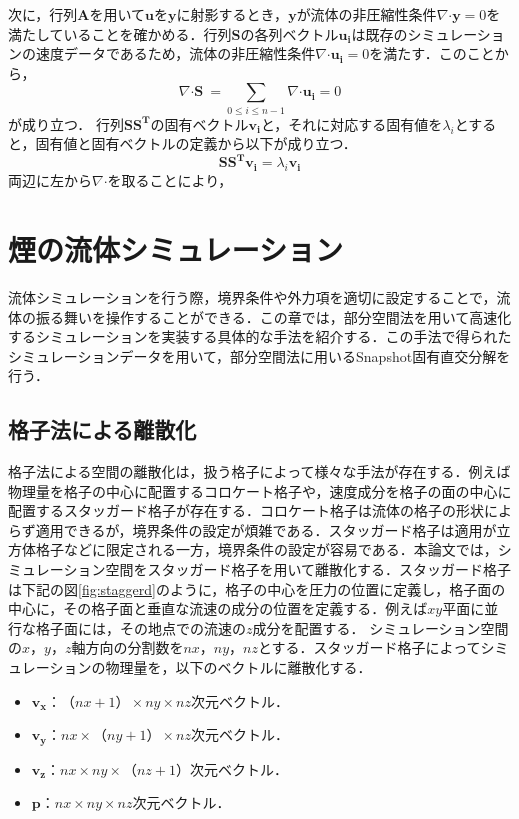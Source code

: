 \documentclass[a4j,12pt]{jreport}
\begin{document}
次に，行列$\mathbf{A}$を用いて$\bm{u}$を$\bm{y}$に射影するとき，$\bm{y}$が流体の非圧縮性条件$\nabla\boldsymbol{\cdot}\bm{y} = 0$を満たしていることを確かめる．行列$\mathbf{S}$の各列ベクトル$\bm{u_i}$は既存のシミュレーションの速度データであるため，流体の非圧縮性条件$\nabla\boldsymbol{\cdot}\bm{u_i} = 0$を満たす．このことから，
\[
	\nabla\boldsymbol{\cdot}\mathbf{S}\ = \sum_{0 \le i \le n-1}\nabla\boldsymbol{\cdot}\bm{u_i} = 0
\]
が成り立つ．
行列$\mathbf{S}\mathbf{S^T}$の固有ベクトル$\bm{v_i}$と，それに対応する固有値を$\lambda_i$とすると，固有値と固有ベクトルの定義から以下が成り立つ．
\[
	\mathbf{S}\mathbf{S^T}\bm{v_i} = \lambda_i\bm{v_i}
\]
両辺に左から$\nabla\boldsymbol{\cdot}$を取ることにより，
\chapter{煙の流体シミュレーション}
流体シミュレーションを行う際，境界条件や外力項を適切に設定することで，流体の振る舞いを操作することができる．この章では，部分空間法を用いて高速化するシミュレーションを実装する具体的な手法を紹介する．この手法で得られたシミュレーションデータを用いて，部分空間法に用いるSnapshot固有直交分解を行う．

\section{格子法による離散化}
格子法による空間の離散化は，扱う格子によって様々な手法が存在する．例えば物理量を格子の中心に配置するコロケート格子や，速度成分を格子の面の中心に配置するスタッガード格子が存在する．コロケート格子は流体の格子の形状によらず適用できるが，境界条件の設定が煩雑である．スタッガード格子は適用が立方体格子などに限定される一方，境界条件の設定が容易である．本論文では，シミュレーション空間をスタッガード格子を用いて離散化する．スタッガード格子は下記の図\ref{fig:staggerd}のように，格子の中心を圧力の位置に定義し，格子面の中心に，その格子面と垂直な流速の成分の位置を定義する．例えば$xy$平面に並行な格子面には，その地点での流速の$z$成分を配置する．
シミュレーション空間の$x$，$y$，$z$軸方向の分割数を$nx$，$ny$，$nz$とする．スタッガード格子によってシミュレーションの物理量を，以下のベクトルに離散化する．
\begin{itemize}
	\item	$\bm{v_x}$：$（nx+1） \times ny \times nz$次元ベクトル．
	\item	$\bm{v_y}$：$nx \times （ny+1） \times nz$次元ベクトル．
	\item	$\bm{v_z}$：$nx \times ny \times （nz+1）$次元ベクトル．
	\item $\bm{p}$：$nx \times ny \times nz$次元ベクトル．
\end{itemize}
\end{document}
